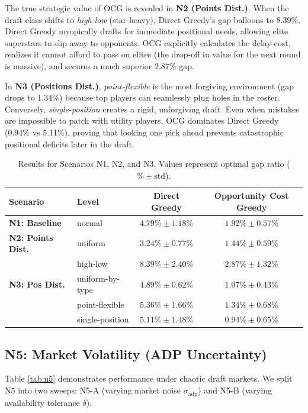 \documentclass[11pt,a4paper]{article}
\begin{document}
The true strategic value of OCG is revealed in \textbf{N2 (Points Dist.)}. When the draft class shifts to \textit{high-low} (star-heavy), Direct Greedy's gap balloons to 8.39\%. Direct Greedy myopically drafts for immediate positional needs, allowing elite superstars to slip away to opponents. OCG explicitly calculates the delay-cost, realizes it cannot afford to pass on elites (the drop-off in value for the next round is massive), and secures a much superior 2.87\% gap.

In \textbf{N3 (Positions Dist.)}, \textit{point-flexible} is the most forgiving environment (gap drops to 1.34\%) because top players can seamlessly plug holes in the roster. Conversely, \textit{single-position} creates a rigid, unforgiving draft. Even when mistakes are impossible to patch with utility players, OCG dominates Direct Greedy (0.94\% vs 5.11\%), proving that looking one pick ahead prevents catastrophic positional deficits later in the draft.

\begin{table}[H]
\centering
\caption{Results for Scenarios N1, N2, and N3. Values represent optimal gap ratio ($\% \pm \text{std}$).}
\label{tab:n1_n3}
\begin{tabular}{llcc}
\toprule
Scenario & Level & Direct Greedy & Opportunity Cost Greedy \\
\midrule
\textbf{N1: Baseline} & normal & $4.79\% \pm 1.18\%$ & $1.92\% \pm 0.57\%$ \\
\midrule
\textbf{N2: Points Dist.} & uniform & $3.24\% \pm 0.77\%$ & $1.44\% \pm 0.59\%$ \\
 & high-low & $8.39\% \pm 2.40\%$ & $\mathbf{2.87\% \pm 1.32\%}$ \\
\midrule
\textbf{N3: Pos Dist.} & uniform-by-type & $4.89\% \pm 0.62\%$ & $1.07\% \pm 0.43\%$ \\
 & point-flexible & $5.36\% \pm 1.66\%$ & $1.34\% \pm 0.68\%$ \\
 & single-position & $5.11\% \pm 1.48\%$ & $\mathbf{0.94\% \pm 0.65\%}$ \\
\bottomrule
\end{tabular}
\end{table}

\subsection{N5: Market Volatility (ADP Uncertainty)}

Table \ref{tab:n5} demonstrates performance under chaotic draft markets. We split N5 into two sweeps: N5-A (varying market noise $\sigma_{\text{adp}}$) and N5-B (varying availability tolerance $\delta$).
\end{document}
